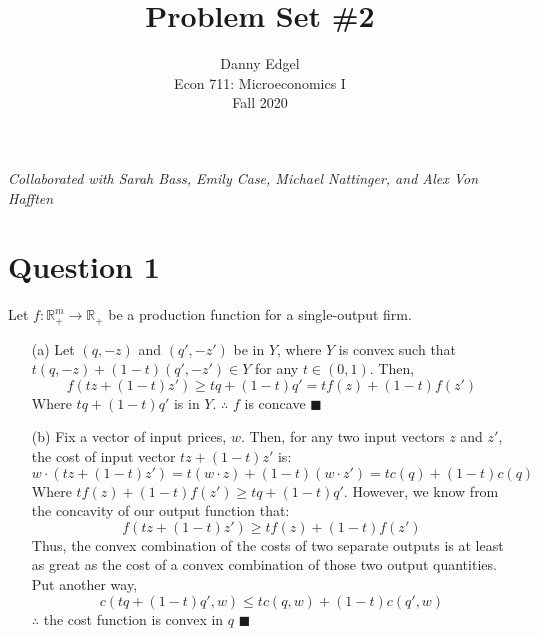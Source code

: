 \documentclass{article}
\newcommand{\R}{\mathbb{R}}
\begin{document}
\title{	Problem Set \#2 }
\author{ 	Danny Edgel 					\\ 
			Econ 711: Microeconomics I		\\
			Fall 2020						\\
		}
\maketitle\thispagestyle{empty}

\noindent\textit{Collaborated with Sarah Bass, Emily Case, Michael Nattinger, and Alex Von Hafften}


\section*{Question 1}
Let $f:\R_+^m\rightarrow\R_+$ be a production function for a single-output firm.
\begin{itemize}
	\item[(a)] Let $(q,-z)$ and $(q',-z')$ be in $Y$, where $Y$ is convex such that $t(q,-z)+(1-t)(q',-z')\in Y$ for any $t\in(0,1)$. Then,
		\[
			f(tz + (1-t)z') \geq tq + (1-t)q' = tf(z) + (1-t)f(z')
		\]
		Where $tq + (1-t)q'$ is in $Y$.  $\therefore$ $f$ is concave $\blacksquare$
		
	\item[(b)] Fix a vector of input prices, $w$. Then, for any two input vectors $z$ and $z'$, the cost of input vector $tz + (1-t)z'$ is:
		\[
			w\cdot(tz + (1-t)z')=t(w\cdot z) + (1-t)(w\cdot z')=tc(q) + (1-t)c(q)
		\]
		Where $tf(z) + (1-t)f(z')\geq tq + (1-t)q'$. However, we know from the concavity of our output function that: 
		\[
			f(tz + (1-t)z') \geq tf(z) + (1-t)f(z')
		\]
		Thus, the convex combination of the costs of two separate outputs is at least as great as the cost of a convex combination of those two output quantities. Put another way,
		\[
			c(tq+(1-t)q',w)\leq tc(q,w) + (1-t)c(q',w)
		\]
		$\therefore$ the cost function is convex in $q$ $\blacksquare$
\end{itemize}	

\end{document}
